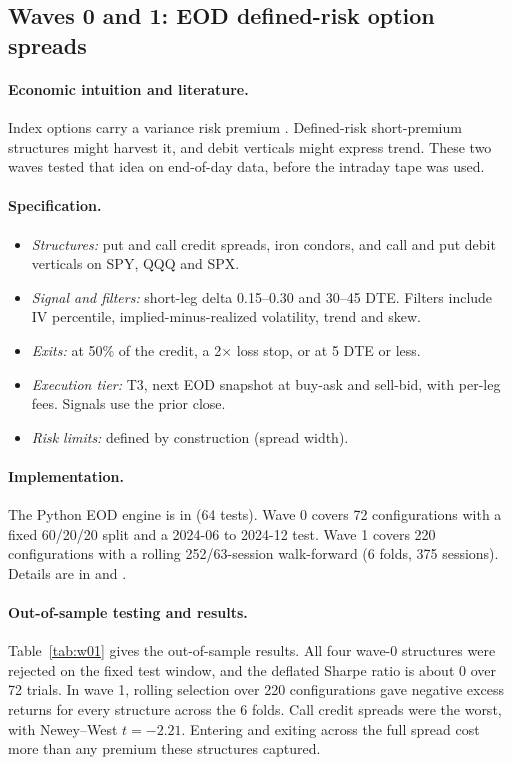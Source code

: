 \documentclass[../main.tex]{subfiles}
\begin{document}
\subsection{Waves 0 and 1: EOD defined-risk option spreads}\label{sec:w01}

\paragraph{Economic intuition and literature.}
Index options carry a variance risk premium \citep{carr2009,bollerslev2009}. Defined-risk short-premium structures might harvest it, and debit verticals might express trend. These two waves tested that idea on end-of-day data, before the intraday tape was used.

\paragraph{Specification.}
\begin{itemize}
\item \emph{Structures:} put and call credit spreads, iron condors, and call and put debit verticals on SPY, QQQ and SPX.
\item \emph{Signal and filters:} short-leg delta 0.15--0.30 and 30--45 DTE. Filters include IV percentile, implied-minus-realized volatility, trend and skew.
\item \emph{Exits:} at 50\% of the credit, a 2$\times$ loss stop, or at 5 DTE or less.
\item \emph{Execution tier:} T3, next EOD snapshot at buy-ask and sell-bid, with per-leg fees. Signals use the prior close.
\item \emph{Risk limits:} defined by construction (spread width).
\end{itemize}

\paragraph{Implementation.}
The Python EOD engine is in  (64 tests). Wave 0 covers 72 configurations with a fixed 60/20/20 split and a 2024-06 to 2024-12 test. Wave 1 covers 220 configurations with a rolling 252/63-session walk-forward (6 folds, 375 sessions). Details are in  and .

\paragraph{Out-of-sample testing and results.}
Table~\ref{tab:w01} gives the out-of-sample results. All four wave-0 structures were rejected on the fixed test window, and the deflated Sharpe ratio is about 0 over 72 trials. In wave 1, rolling selection over 220 configurations gave negative excess returns for every structure across the 6 folds. Call credit spreads were the worst, with Newey--West $t = -2.21$. Entering and exiting across the full spread cost more than any premium these structures captured.
\end{document}
